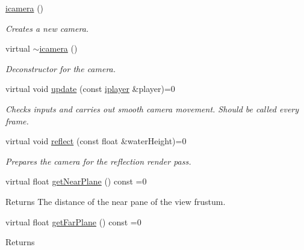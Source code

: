 \begin{DoxyCompactItemize}
\item 
\hyperlink{classflounder_1_1icamera_aec1dc813f1b6a4b4ea2c56d61fa28525}{icamera} ()
\begin{DoxyCompactList}\small\item\em Creates a new camera. \end{DoxyCompactList}\item 
virtual \hyperlink{classflounder_1_1icamera_a5aa4bb60028823af733a8de1532b7f6f}{$\sim$icamera} ()
\begin{DoxyCompactList}\small\item\em Deconstructor for the camera. \end{DoxyCompactList}\item 
virtual void \hyperlink{classflounder_1_1icamera_ac488c3db589fbba024d80d1f41dd7983}{update} (const \hyperlink{classflounder_1_1iplayer}{iplayer} \&player)=0
\begin{DoxyCompactList}\small\item\em Checks inputs and carries out smooth camera movement. Should be called every frame. \end{DoxyCompactList}\item 
virtual void \hyperlink{classflounder_1_1icamera_a20ee0d37d318012ac51e132ed02af6da}{reflect} (const float \&water\+Height)=0
\begin{DoxyCompactList}\small\item\em Prepares the camera for the reflection render pass. \end{DoxyCompactList}\item 
\mbox{\label{classflounder_1_1icamera_a1b7c9e3be4be8c5aab2a3c1b41430c47}} 
virtual float \hyperlink{classflounder_1_1icamera_a1b7c9e3be4be8c5aab2a3c1b41430c47}{get\+Near\+Plane} () const =0
\begin{DoxyCompactList}\small\item\em \begin{DoxyReturn}{Returns}
The distance of the near pane of the view frustum. 
\end{DoxyReturn}
\end{DoxyCompactList}\item 
\mbox{\label{classflounder_1_1icamera_a38f71d53573a018836d899973996a3c0}} 
virtual float \hyperlink{classflounder_1_1icamera_a38f71d53573a018836d899973996a3c0}{get\+Far\+Plane} () const =0
\begin{DoxyCompactList}\small\item\em \begin{DoxyReturn}{Returns}

\end{DoxyReturn}
\end{DoxyCompactList}
\end{DoxyCompactItemize}
